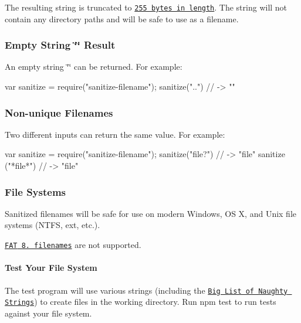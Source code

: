 The resulting string is truncated to \href{http://unix.stackexchange.com/questions/32795/what-is-the-maximum-allowed-filename-and-folder-size-with-ecryptfs}{\tt 255 bytes in length}. The string will not contain any directory paths and will be safe to use as a filename.

\subsubsection*{Empty String {\ttfamily \char`\"{}\char`\"{}} Result}

An empty string {\ttfamily \char`\"{}\char`\"{}} can be returned. For example\+:


\begin{DoxyCode}
var sanitize = require("sanitize-filename");
sanitize("..")
// -> ""
\end{DoxyCode}


\subsubsection*{Non-\/unique Filenames}

Two different inputs can return the same value. For example\+:


\begin{DoxyCode}
var sanitize = require("sanitize-filename");
sanitize("file?")
// -> "file"
sanitize ("*file*")
// -> "file"
\end{DoxyCode}


\subsubsection*{File Systems}

Sanitized filenames will be safe for use on modern Windows, OS X, and Unix file systems ({\ttfamily N\+T\+FS}, {\ttfamily ext}, etc.).

\href{https://en.wikipedia.org/wiki/8.3_filename}{\tt {\ttfamily F\+AT} 8. filenames} are not supported.

\paragraph*{Test Your File System}

The test program will use various strings (including the \href{https://github.com/minimaxir/big-list-of-naughty-strings}{\tt Big List of Naughty Strings}) to create files in the working directory. Run {\ttfamily npm test} to run tests against your file system.

